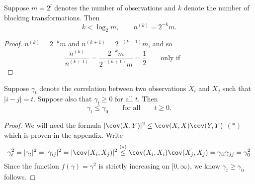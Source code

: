 \documentclass[11pt,english,a4paper]{article}
\begin{document}
\begin{lemma} Suppose $m = 2^l$ denotes the number of observations and $k$ denote the number of blocking transformations. Then
\[
k < \log_2m, \qquad n^{(k)} = 2^{-k}m.
\]\label{lemma:k}
\end{lemma}
\begin{proof}
$n^{(k)} = 2^{-k}m$ and $n^{(k+1)} = 2^{-(k+1)}m$, and so
\[
\frac{n^{(k)}}{n^{(k+1)}} = \frac{2^{-k}m}{2^{-(k+1)}m} = \frac{1}{2} \qquad \text{only if} \qquad 
\]  
\end{proof}
\begin{lemma} Suppose $\gamma_t$ denote the correlation between two observations $X_i$ and $X_j$ such that $|i-j| = t$. Suppose also that $\gamma_t \geq 0$ for all $t$. Then 
\[
\gamma_t \leq \gamma_0 \qquad \text{for all} \qquad t \geq 0.
\]
\end{lemma}
\begin{proof}
We will need the formula $| \cov (X,Y) |^2 \leq \cov (X,X) \cov (Y,Y)$ $(*)$ which is proven in the appendix. Write
\[
\gamma_{t}^2 = |\gamma_t|^2 = |\gamma_{ij}|^2 = | \cov (X_i,X_j) |^2 \stackrel{(*)}{\leq} \cov (X_i,X_i) \cov (X_j,X_j) = \gamma_{ii}\gamma_{jj} = \gamma_0^2
\]
Since the function $f(\gamma) = \gamma^2$ is strictly increasing on $[0,\infty)$, we know $\gamma_t \geq \gamma_0$ follows.
\end{proof}
\end{document}
